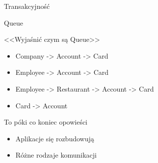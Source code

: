 \documentclass{beamer}
\begin{document}
\begin{frame}{}
	\begin{center}
		\huge{Transakcyjność}
	\end{center}
\end{frame}

\begin{frame}{}
	\begin{center}
		\huge{Queue}
	\end{center}
\end{frame}

\begin{frame}{}
	\begin{center}
		\huge{<<Wyjaśnić czym są Queue>>}
	\end{center}
\end{frame}

\begin{frame}{}
	\begin{huge}
		\begin{itemize}[<+->]
			\item Company -> Account -> Card
			\item Employee -> Account -> Card
		\end{itemize}
	\end{huge}
\end{frame}

\begin{frame}{}
	\begin{huge}
		\begin{itemize}[<+->]
			\item Employee -> Restaurant -> Account -> Card
			\item Card -> Account
		\end{itemize}
	\end{huge}
\end{frame}


\begin{frame}{}
	\begin{center}
		\Huge{To póki co koniec opowieści}
	\end{center}
\end{frame}

\begin{frame}{}
	\begin{huge}
		\begin{itemize}[<+->]
			\item Aplikacje się rozbudowują
			\item Różne rodzaje komunikacji
		\end{itemize}
	\end{huge}
\end{frame}
\end{document}
